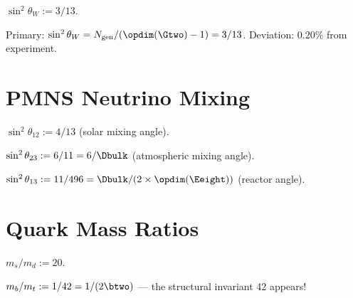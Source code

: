 \begin{definition}\label{def:sin2_theta_W_obs}
    \leanok
    $\sin^2\theta_W := 3/13$.
\end{definition}

\begin{theorem}\label{thm:sin2_theta_W_14}
    \leanok
    Primary: $\sin^2\theta_W = N_{\mathrm{gen}} / (\opdim(\Gtwo) - 1) = 3/13$.
    Deviation: $0.20\%$ from experiment.
\end{theorem}

\section{PMNS Neutrino Mixing}

\begin{definition}\label{def:theta12_pmns}
    \leanok
    $\sin^2\theta_{12} := 4/13$ (solar mixing angle).
\end{definition}

\begin{definition}\label{def:theta23_pmns}
    \leanok
    $\sin^2\theta_{23} := 6/11 = 6/\Dbulk$ (atmospheric mixing angle).
\end{definition}

\begin{definition}\label{def:theta13_pmns}
    \leanok
    $\sin^2\theta_{13} := 11/496 = \Dbulk / (2 \times \opdim(\Eeight))$ (reactor angle).
\end{definition}

\section{Quark Mass Ratios}

\begin{definition}[$m_s/m_d$]\label{def:ms_md}
    \leanok
    $m_s / m_d := 20$.
\end{definition}

\begin{definition}[$m_b/m_t$]\label{def:mb_mt}
    \leanok
    $m_b / m_t := 1/42 = 1/(2\btwo)$ --- the structural invariant 42 appears!
\end{definition}

